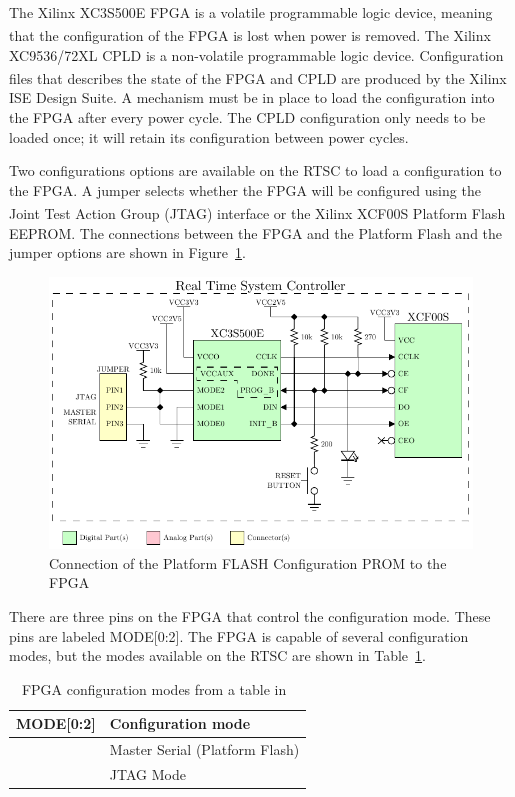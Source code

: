 The Xilinx\textsuperscript{\textregistered} XC3S500E FPGA is a volatile programmable logic device, meaning that the configuration of the FPGA is lost when power is removed.  The Xilinx\textsuperscript{\textregistered} XC9536/72XL CPLD is a non-volatile programmable logic device.  Configuration files that describes the state of the FPGA and CPLD are produced by the Xilinx\textsuperscript{\textregistered} ISE Design Suite.  A mechanism must be in place to load the configuration into the FPGA after every power cycle.  The CPLD configuration only needs to be loaded once; it will retain its configuration between power cycles.

Two configurations options are available on the RTSC to load a configuration to the FPGA.  A jumper selects whether the FPGA will be configured using the Joint Test Action Group (JTAG) interface or the Xilinx\textsuperscript{\textregistered} XCF00S  Platform Flash EEPROM.  The connections between the FPGA and the Platform Flash and the jumper options are shown in Figure~\ref{fig:Config}.

\begin{figure}[H]
	\centering 
		\includegraphics{./figures/Config} 
	\caption{Connection of the Platform FLASH Configuration PROM to the FPGA~\cite{DigilentNexys2rm,DigilentNexys2sch}\label{fig:Config}}
\end{figure}

There are three pins on the FPGA that control the configuration mode.  These pins are labeled MODE[0:2].  The FPGA is capable of several configuration modes, but the modes available on the RTSC are shown in Table~\ref{tab:ConfigMode}.

\renewcommand{\arraystretch}{1.3}
\begin{table}[h]
\centering
\begin{tabular}{|l|l|}
\hline
MODE[0:2]& Configuration mode\\
\hline
[0 0 0] & Master Serial (Platform Flash)\\
\hline
[1 0 1] & JTAG Mode\\
\hline
\end{tabular}
\caption{FPGA configuration modes from a table in~\cite{Spartan3ConfigUG}\label{tab:ConfigMode} }

\end{table}
\renewcommand{\arraystretch}{1.0}

